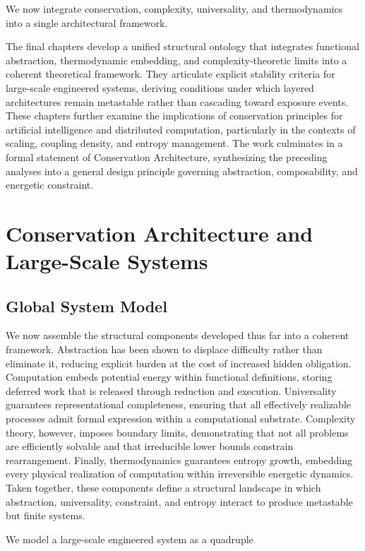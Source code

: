 \documentclass[11pt,openany]{book}
\begin{document}
We now integrate conservation, complexity, universality,
and thermodynamics into a single architectural framework.

The final chapters develop a unified structural ontology that integrates 
functional abstraction, thermodynamic embedding, and complexity-theoretic 
limits into a coherent theoretical framework. They articulate explicit stability 
criteria for large-scale engineered systems, deriving conditions under which 
layered architectures remain metastable rather than cascading toward exposure 
events. These chapters further examine the implications of conservation principles 
for artificial intelligence and distributed computation, particularly in the 
contexts of scaling, coupling density, and entropy management. The work culminates 
in a formal statement of Conservation Architecture, synthesizing the preceding 
analyses into a general design principle governing abstraction, composability, 
and energetic constraint.

\chapter{Conservation Architecture and Large-Scale Systems}

\section{Global System Model}

We now assemble the structural components developed thus far into a coherent framework. Abstraction has been shown to displace difficulty rather than eliminate it, reducing explicit burden at the cost of increased hidden obligation. Computation embeds potential energy within functional definitions, storing deferred work that is released through reduction and execution. Universality guarantees representational completeness, ensuring that all effectively realizable processes admit formal expression within a computational substrate. Complexity theory, however, imposes boundary limits, demonstrating that not all problems are efficiently solvable and that irreducible lower bounds constrain rearrangement. Finally, thermodynamics guarantees entropy growth, embedding every physical realization of computation within irreversible energetic dynamics. Taken together, these components define a structural landscape in which abstraction, universality, constraint, and entropy interact to produce metastable but finite systems. 

We model a large-scale engineered system as a quadruple
\end{document}
